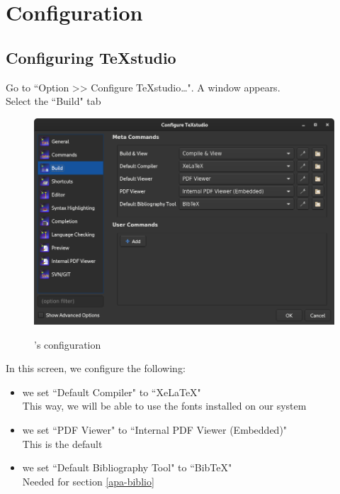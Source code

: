 \bigskip

\section{Configuration}


\subsection{Configuring \TeX studio}


Go to ``Option >> Configure TeXstudio\dots". A window appears. \\
Select the ``Build" tab


\begin{figure}[h]
	\caption{\TeXstudio's configuration}
	\includegraphics[keepaspectratio,width=\columnwidth]{files/texstudio-configure-embedded.png}
	\label{fig:texstudio-configure-embedded}
\end{figure}


In this screen, we configure the following:

\begin{itemize}
	\item we set ``Default Compiler" to ``XeLaTeX" \\
	This way, we will be able to use the fonts installed on our system
	
	\item we set ``PDF Viewer" to ``Internal PDF Viewer (Embedded)" \\
	This is the default
	
	\item we set ``Default Bibliography Tool" to ``BibTeX" \\
	Needed for section \ref{apa-biblio}
	
\end{itemize}


